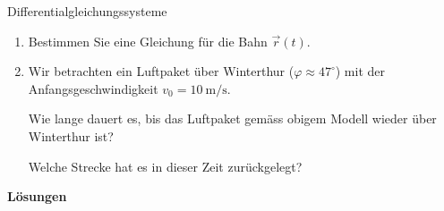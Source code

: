 \begin{ueb}{Differentialgleichungssysteme}{}
\begin{enumerate}
\begin{enumerate}
                  \item Bestimmen Sie eine Gleichung für die Bahn
                        \(\vec{r}(t)\).

                  \item Wir betrachten ein Luftpaket über Winterthur
                        (\(\varphi\approx47^\circ\)) mit der
                        Anfangsgeschwindigkeit
                        \(v_0=\SI{10}{\meter\per\second}\).

                        Wie lange dauert es, bis das Luftpaket gemäss
                        obigem Modell wieder über Winterthur ist?

                        Welche Strecke hat es in dieser Zeit zurückgelegt?
              \end{enumerate}
    \end{enumerate}

\end{ueb}

\clearpage
\textbf{Lösungen}

